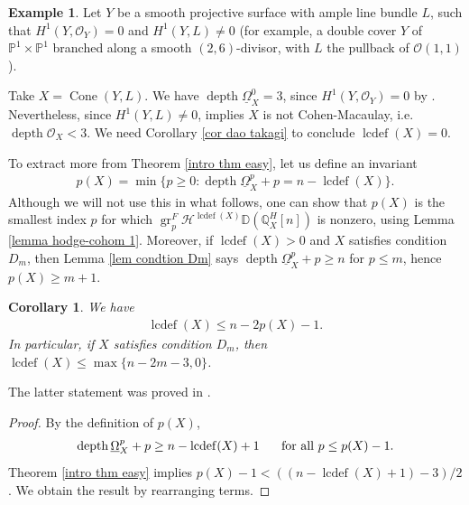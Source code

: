 \documentclass[11pt]{amsart}
\newtheorem{corollary}[equation]{Corollary}
\theoremstyle{definition}
\newtheorem{example}[equation]{Example}
\theoremstyle{plain}
\newcounter{intro}
\DeclareMathOperator{\gr}{gr}
\DeclareMathOperator{\lcdef}{lcdef}
\DeclareMathOperator{\depth}{depth}
\DeclareMathOperator{\Cone}{Cone}
\begin{document}
\begin{example}\label{exmp beat dao takagi}
Let $Y$ be a smooth projective surface with ample line bundle $L$, such that $H^1(Y, \mathscr{O}_Y) = 0$ and $H^1(Y, L) \neq 0$ (for example, a double cover $Y$ of $\mathbb{P}^1 \times \mathbb{P}^1$ branched along a smooth $(2, 6)$-divisor, with $L$ the pullback of $\mathscr{O}(1,1)$).

Take $X = \Cone(Y, L)$. We have $\depth \underline{\Omega}_X^0 = 3$, since $H^1(Y, \mathscr{O}_Y) = 0$ by \cite[Theorem $3.1(2)$]{popa shen}. Nevertheless, since $H^1(Y, L) \neq 0$, \cite[Proposition B.$3$]{kebekus schnell} implies $X$ is not Cohen-Macaulay, i.e. $\depth \mathscr{O}_X < 3$. We need Corollary \ref{cor dao takagi} to conclude $\lcdef(X) = 0$.
\end{example}


To extract more from Theorem \ref{intro thm easy}, let us define an invariant
\begin{align*}
    p(X) = \min \{ p \geq 0 : \depth \underline{\Omega}_X^p + p = n - \lcdef(X) \}.
\end{align*}
Although we will not use this in what follows, one can show that $p(X)$ is the smallest index $p$ for which $\gr_{p}^F \mathcal{H}^{\lcdef(X)}\mathbb{D} (\mathbb{Q}_X^H[n])$ is nonzero, using Lemma \ref{lemma hodge-cohom 1}. Moreover, if $\lcdef(X) > 0$ and $X$ satisfies condition $D_m$, then Lemma \ref{lem condtion Dm} says $\depth \underline{\Omega}_X^p+p \geq n$ for $p \leq m$, hence $p(X) \geq m+1$.

\begin{corollary}\label{cor lcdef vs q}
We have
\begin{align*}
    \lcdef(X) \leq n - 2p(X) - 1.
\end{align*}    
In particular, if $X$ satisfies condition $D_m$, then  $\lcdef(X) \leq \max\{ n-2m-3, 0 \}$.
\end{corollary}

The latter statement was proved in \cite[Corollary $7.5$]{popa park lefschetz}.

\begin{proof}
By the definition of $p(X)$,
\begin{align*}
    \depth \underline{\Omega}_X^p + p \geq n-\lcdef(X) + 1 \hspace{.5cm} \text{ for all } p \leq p(X)-1.
\end{align*}
Theorem \ref{intro thm easy} implies $p(X) - 1 < ((n-\lcdef(X)+1)-3)/2$. We obtain the result by rearranging terms.
\end{proof}
\end{document}
